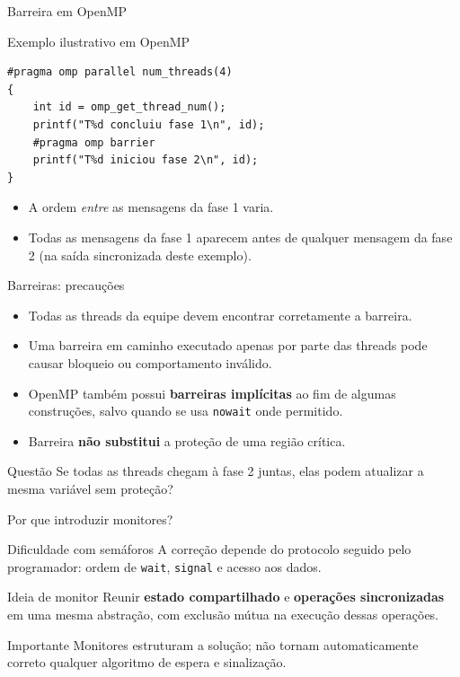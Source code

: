 \documentclass[aspectratio=169,11pt]{beamer}
\begin{document}
\begin{frame}[fragile]{Barreira em OpenMP}
\small
\begin{block}{Exemplo ilustrativo em OpenMP}
\begin{verbatim}
#pragma omp parallel num_threads(4)
{
    int id = omp_get_thread_num();
    printf("T%d concluiu fase 1\n", id);
    #pragma omp barrier
    printf("T%d iniciou fase 2\n", id);
}
\end{verbatim}
\end{block}
\begin{itemize}
\item A ordem \emph{entre} as mensagens da fase 1 varia.
\item Todas as mensagens da fase 1 aparecem antes de qualquer mensagem da fase 2 (na saída sincronizada deste exemplo).
\end{itemize}
\end{frame}

\begin{frame}{Barreiras: precauções}
\small
\begin{itemize}
\item Todas as threads da equipe devem encontrar corretamente a barreira.
\item Uma barreira em caminho executado apenas por parte das threads pode causar bloqueio ou comportamento inválido.
\item OpenMP também possui \textbf{barreiras implícitas} ao fim de algumas construções, salvo quando se usa \texttt{nowait} onde permitido.
\item Barreira \textbf{não substitui} a proteção de uma região crítica.
\end{itemize}
\begin{alertblock}{Questão}
Se todas as threads chegam à fase 2 juntas, elas podem atualizar a mesma variável sem proteção?
\end{alertblock}
\end{frame}

\begin{frame}{Por que introduzir monitores?}
\small
\begin{block}{Dificuldade com semáforos}
A correção depende do protocolo seguido pelo programador: ordem de \texttt{wait}, \texttt{signal} e acesso aos dados.
\end{block}
\begin{block}{Ideia de monitor}
Reunir \textbf{estado compartilhado} e \textbf{operações sincronizadas} em uma mesma abstração, com exclusão mútua na execução dessas operações.
\end{block}
\begin{alertblock}{Importante}
Monitores estruturam a solução; não tornam automaticamente correto qualquer algoritmo de espera e sinalização.
\end{alertblock}
\end{frame}
\end{document}
